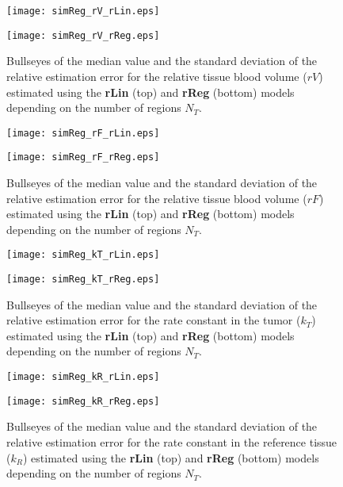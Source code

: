\begin{subfigures}
    \begin{figure}\centering
        \texttt{[image: simReg\_rV\_rLin.eps]}
        \par%
        \texttt{[image: simReg\_rV\_rReg.eps]}
        \caption{Bullseyes of the median value and the standard deviation of the relative estimation error for the relative tissue blood volume ($rV$) estimated using the \textbf{rLin} (top) and \textbf{rReg} (bottom) models depending on the number of regions $N_T$.}
        \label{fig:region_rV}
    \end{figure}
    \begin{figure}\centering
        \texttt{[image: simReg\_rF\_rLin.eps]}
        \par%
        \texttt{[image: simReg\_rF\_rReg.eps]}
        \caption{Bullseyes of the median value and the standard deviation of the relative estimation error for the relative tissue blood volume ($rF$) estimated using the \textbf{rLin} (top) and \textbf{rReg} (bottom) models depending on the number of regions $N_T$.}
        \label{fig:region_rF}
    \end{figure}
    \begin{figure}\centering
        \texttt{[image: simReg\_kT\_rLin.eps]}
        \par%
        \texttt{[image: simReg\_kT\_rReg.eps]}
        \caption{Bullseyes of the median value and the standard deviation of the relative estimation error for the rate constant in the tumor ($k_T$) estimated using the \textbf{rLin} (top) and \textbf{rReg} (bottom) models depending on the number of regions $N_T$.}
        \label{fig:region_kT}
    \end{figure}
    \begin{figure}\centering
        \texttt{[image: simReg\_kR\_rLin.eps]}
        \par%
        \texttt{[image: simReg\_kR\_rReg.eps]}
        \caption{Bullseyes of the median value and the standard deviation of the relative estimation error for the rate constant in the reference tissue ($k_R$) estimated using the \textbf{rLin} (top) and \textbf{rReg} (bottom) models depending on the number of regions $N_T$.}
        \label{fig:region_kR}
        \end{figure}
\end{subfigures}
\FloatBarrier

